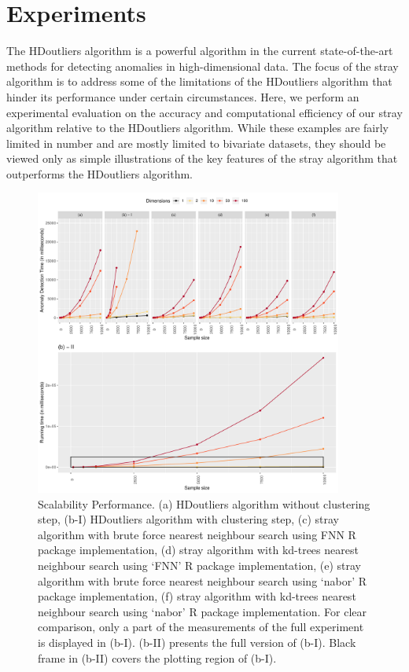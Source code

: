 \documentclass[11pt,a4paper,]{article}
\theoremstyle{definition}
\theoremstyle{definition}
\theoremstyle{definition}
\theoremstyle{remark}
\begin{document}
\hypertarget{experiments}{%
\section{Experiments}\label{experiments}}

\label{sec:experiments}

The HDoutliers algorithm is a powerful algorithm in the current state-of-the-art methods for detecting anomalies in high-dimensional data. The focus of the stray algorithm is to address some of the limitations of the HDoutliers algorithm that hinder its performance under certain circumstances. Here, we perform an experimental evaluation on the accuracy and computational efficiency of our stray algorithm relative to the HDoutliers algorithm. While these examples are fairly limited in number and are mostly limited to bivariate datasets, they should be viewed only as simple illustrations of the key features of the stray algorithm that outperforms the HDoutliers algorithm.

\begin{figure}[h]

{\centering \includegraphics[width=0.9\textwidth]{figure/performEval-1} 

}

\caption{Scalability Performance. (a) HDoutliers algorithm without clustering step, (b-I) HDoutliers algorithm with clustering step, (c) stray algorithm with brute force nearest neighbour search using FNN R package implementation, (d) stray algorithm with kd-trees nearest neighbour search using `FNN' R package implementation, (e) stray algorithm with brute force nearest neighbour search using `nabor' R package implementation, (f) stray algorithm with kd-trees nearest neighbour search using `nabor' R package implementation. For clear comparison, only a part of the measurements of the full experiment  is displayed in  (b-I). (b-II) presents the full version of (b-I). Black frame in (b-II) covers the plotting region of (b-I).}\label{fig:performEval}
\end{figure}
\end{document}
